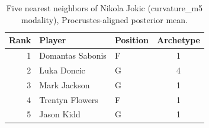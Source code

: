 \begin{table}[htbp]
  \centering\small
  \begin{tabular}{rllc}
    \toprule
    Rank & Player & Position & Archetype \\
    \midrule
    1 & Domantas Sabonis & F & 1 \\
    2 & Luka Doncic & G & 4 \\
    3 & Mark Jackson & G & 1 \\
    4 & Trentyn Flowers & F & 1 \\
    5 & Jason Kidd & G & 1 \\
    \bottomrule
  \end{tabular}
  \caption{Five nearest neighbors of Nikola Jokic (curvature_m5 modality), Procrustes-aligned posterior mean.}
  \label{tab:Nikola_Jokic_neighbors_curvature_m5}
\end{table}

